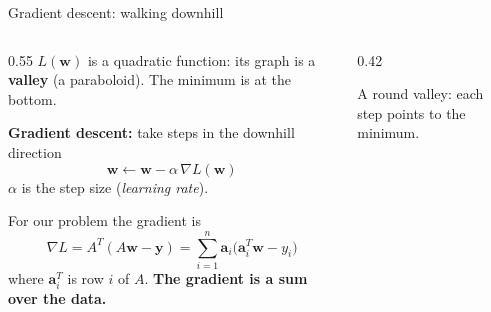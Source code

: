 \documentclass[10pt,aspectratio=169]{beamer}
\newcommand{\hl}[1]{\textcolor{accent}{\textbf{#1}}}
\begin{document}
\begin{frame}{Gradient descent: walking downhill}
  \begin{columns}[c]
    \begin{column}{0.55\textwidth}
      $L(\bm{w})$ is a quadratic function: its graph is a \hl{valley}
      (a paraboloid). The minimum is at the bottom.
      \vspace{0.5em}

      \textbf{Gradient descent:} take steps in the downhill direction
      \[
        \bm{w} \leftarrow \bm{w} - \alpha\, \nabla L(\bm{w})
      \]
      $\alpha$ is the step size (\emph{learning rate}).
      \vspace{0.5em}

      For our problem the gradient is
      \[
        \nabla L = A^T(A\bm{w} - \bm{y})
        = \sum_{i=1}^{n} \bm{a}_i \big(\bm{a}_i^T \bm{w} - y_i\big)
      \]
      where $\bm{a}_i^T$ is row $i$ of $A$.
      \hl{The gradient is a sum over the data.}
    \end{column}
    \begin{column}{0.42\textwidth}
      \centering

      {\scriptsize A round valley: each step points to the minimum.}
    \end{column}
  \end{columns}
\end{frame}
\end{document}
